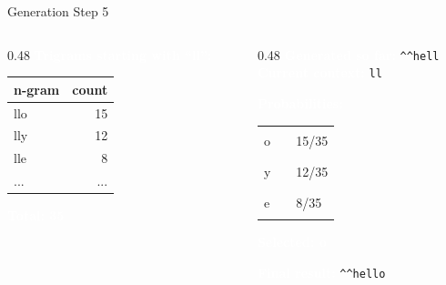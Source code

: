 \documentclass[aspectratio=169]{beamer}
\renewcommand{\textbf}[1]{\textcolor{white}{\bfseries #1}}
\begin{document}
\begin{frame}[c,fragile]{Generation Step 5}
\begin{columns}[c]
\begin{column}{0.48\textwidth}
\textbf{Trigrams starting with ``ll'':}

\vspace{0.5em}
\begin{tabular}{|l|r|}
\hline
\rowcolor{codebg}
n-gram & count \\
\hline
llo & 15 \\
lly & 12 \\
lle & 8 \\
... & ... \\
\hline
\end{tabular}

\vspace{0.5em}
\textbf{Total: 35}
\end{column}

\begin{column}{0.48\textwidth}
\textbf{Generated so far:} \texttt{\textasciicircum\textasciicircum hell}\\
\textbf{Current context:} \texttt{ll}

\vspace{0.5em}
\textbf{Probabilities:}

\begin{tabular}{@{}l@{ }l@{ }l@{}}
o & \textcolor{miamired}{\rule{3.4cm}{0.3cm}} & 15/35 \\
y & \textcolor{miamired}{\rule{2.7cm}{0.3cm}} & 12/35 \\
e & \textcolor{miamired}{\rule{1.8cm}{0.3cm}} & 8/35
\end{tabular}

\vspace{0.5em}
\textbf{Selected: o}

\vspace{0.5em}
\textbf{Final result:} \texttt{\textasciicircum\textasciicircum hello}
\end{column}
\end{columns}
\end{frame}
\end{document}
